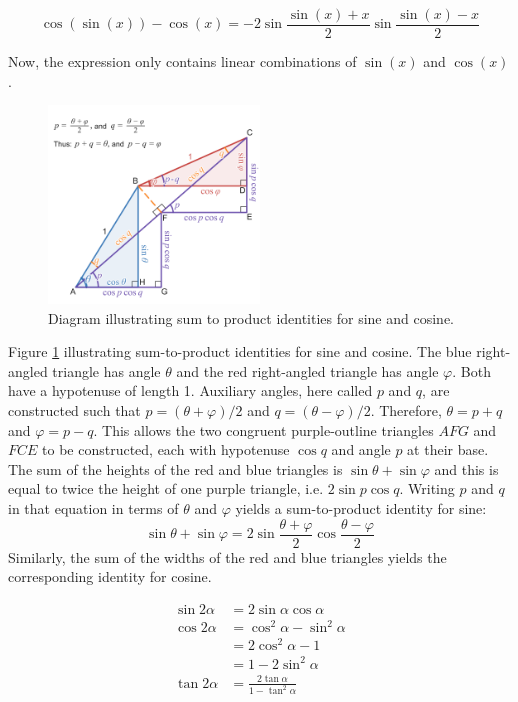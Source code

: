 \begin{equation*}
    \cos(\sin(x)) - \cos(x) = -2 \sin\frac{\sin(x) + x}{2} \sin\frac{\sin(x) - x}{2}
\end{equation*}

Now, the expression only contains linear combinations of 
$\sin(x)$ and $\cos(x)$.

\begin{figure}
    \centering
    \includegraphics[width=0.5\textwidth]{figure/Diagram_illustrating_sum_to_product_identities_for_sine_and_cosine.png}
    \caption{Diagram illustrating sum to product identities for sine and cosine.}
    \label{fig:Diagram_illustrating_sum_to_product_identities_for_sine_and_cosine}
\end{figure}

Figure \ref{fig:Diagram_illustrating_sum_to_product_identities_for_sine_and_cosine} 
illustrating sum-to-product identities for sine and cosine. 
The blue right-angled triangle has angle $\theta$ and the 
red right-angled triangle has angle $\varphi$. 
Both have a hypotenuse of length 1. Auxiliary angles, here called
$p$ and $q$, are constructed such that $p = (\theta + \varphi) / 2$ 
and $q = (\theta - \varphi) / 2$. Therefore, $\theta = p + q$
and $\varphi = p - q$.
This allows the two congruent purple-outline triangles
$AFG$ and $FCE$ to be constructed, 
each with hypotenuse $\cos q$ and angle $p$ at their base.
The sum of the heights of the red and blue triangles is
$\sin \theta + \sin \varphi$  and this is equal to 
twice the height of one purple triangle, 
i.e. $2 \sin p \cos q$. Writing $p$ and $q$ in that
equation in terms of $\theta$ and $\varphi$ yields 
a sum-to-product identity for sine:
\[
    \sin \theta + \sin \varphi = 2 \sin \dfrac{\theta + \varphi}{2} \cos \dfrac{\theta - \varphi}{2}
\]
Similarly, the sum of the widths of 
the red and blue triangles yields the corresponding identity for cosine.

\begin{theorem}
    \label{thm:trig-double-angle-equations}
    \begin{align*}
        \sin 2 \alpha &= 2 \sin \alpha \cos \alpha \\
        \cos 2 \alpha &= \cos^2 \alpha - \sin^2 \alpha \\ 
                      &= 2 \cos^2 \alpha - 1 \\
                      &= 1 - 2 \sin^2 \alpha \\
        \tan 2 \alpha &= \frac{2 \tan \alpha}{1 - \tan^2 \alpha}
    \end{align*}
\end{theorem}

